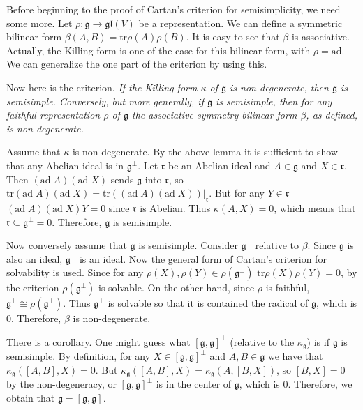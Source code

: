 \documentclass{article}
\newcommand{\tr}[1]{\mathrm{tr}#1}
\newcommand{\lie}[1]{\mathfrak{#1}}
\newcommand{\ad}[1]{\mathrm{ad}\; #1}
\begin{document}
Before beginning to the proof of Cartan's criterion for semisimplicity, we need some more.
Let $\rho : \lie{g} \to \lie{gl}(V)$ be a representation.
We can define a symmetric bilinear form $\beta(A, B) = \tr{\rho(A) \rho(B)}$.
It is easy to see that $\beta$ is associative.
Actually, the Killing form is one of the case for this bilinear form, with $\rho = \textrm{ad}$.
We can generalize the one part of the criterion by using this.

Now here is the criterion.
\textit{If the Killing form $\kappa$ of $\lie{g}$ is non-degenerate, then $\lie{g}$ is semisimple.
Conversely, but more generally, if $\lie{g}$ is semisimple, then for any faithful representation $\rho$ of $\lie{g}$ the associative symmetry bilinear form $\beta$, as defined, is non-degenerate.}

Assume that $\kappa$ is non-degenerate.
By the above lemma it is sufficient to show that any Abelian ideal is in $\lie{g}^\perp$.
Let $\lie{r}$ be an Abelian ideal and $A \in \lie{g}$ and $X \in \lie{r}$.
Then $(\ad{A})(\ad{X})$ sends $\lie{g}$ into $\lie{r}$, so $\tr{(\ad{A})(\ad{X})} = \tr{((\ad{A})(\ad{X}))|_{\lie{r}}}$.
But for any $Y \in \lie{r}$ $(\ad{A})(\ad{X})Y = 0$ since $\lie{r}$ is Abelian.
Thus $\kappa(A, X) = 0$, which means that $\lie{r} \subseteq \lie{g}^\perp = 0$.
Therefore, $\lie{g}$ is semisimple.

Now conversely assume that $\lie{g}$ is semisimple.
Consider $\lie{g}^{\perp}$ relative to $\beta$.
Since $\lie{g}$ is also an ideal, $\lie{g}^{\perp}$ is an ideal.
Now the general form of Cartan's criterion for solvability is used.
Since for any $\rho(X), \rho(Y) \in \rho(\lie{g}^{\perp})$ $\tr{\rho(X) \rho(Y)} = 0$, by the criterion $\rho(\lie{g}^{\perp})$ is solvable.
On the other hand, since $\rho$ is faithful, $\lie{g}^{\perp} \cong \rho(\lie{g}^{\perp})$.
Thus $\lie{g}^{\perp}$ is solvable so that it is contained the radical of $\lie{g}$, which is 0.
Therefore, $\beta$ is non-degenerate.

There is a corollary.
One might guess what $[\lie{g}, \lie{g}]^\perp$ (relative to the $\kappa_\lie{g}$) is if $\lie{g}$ is semisimple.
By definition, for any $X \in [\lie{g}, \lie{g}]^\perp$ and $A, B \in \lie{g}$ we have that $\kappa_\lie{g}([A, B], X) = 0$.
But $\kappa_\lie{g}([A, B], X) = \kappa_\lie{g}(A, [B, X])$, so $[B, X] = 0$ by the non-degeneracy, or $[\lie{g}, \lie{g}]^\perp$ is in the center of $\lie{g}$, which is 0.
Therefore, we obtain that \textit{$\lie{g} = [\lie{g}, \lie{g}]$.}

\newpage
\end{document}
